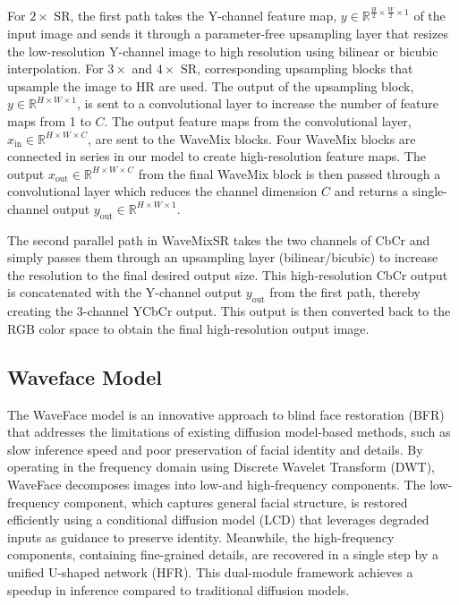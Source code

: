 For $2\times$ SR, the first path takes the Y-channel feature map, $y \in \mathbb{R}^{\frac{H}{2} \times \frac{W}{2} \times 1}$ of the input image and sends it through a parameter-free upsampling layer that resizes the low-resolution Y-channel image to high resolution using bilinear or bicubic interpolation. For $3\times$ and $4\times$ SR, corresponding upsampling blocks that upsample the image to HR are used. The output of the upsampling block, $y \in \mathbb{R}^{H \times W \times 1}$, is sent to a convolutional layer to increase the number of feature maps from 1 to $C$. The output feature maps from the convolutional layer, $x_{\text{in}} \in \mathbb{R}^{H \times W \times C}$, are sent to the WaveMix blocks. Four WaveMix blocks are connected in series in our model to create high-resolution feature maps. The output $x_{\text{out}} \in \mathbb{R}^{H \times W \times C}$ from the final WaveMix block is then passed through a convolutional layer which reduces the channel dimension $C$ and returns a single-channel output $y_{\text{out}} \in \mathbb{R}^{H \times W \times 1}$.

The second parallel path in WaveMixSR takes the two channels of CbCr and simply passes them through an upsampling layer (bilinear/bicubic) to increase the resolution to the final desired output size. This high-resolution CbCr output is concatenated with the Y-channel output $y_{\text{out}}$ from the first path, thereby creating the 3-channel YCbCr output. This output is then converted back to the RGB color space to obtain the final high-resolution output image.


\subsection{Waveface Model}

The WaveFace model is an innovative approach to blind face restoration (BFR) that addresses the limitations of existing diffusion model-based methods, such as slow inference speed and poor preservation of facial identity and details. By operating in the frequency domain using Discrete Wavelet Transform (DWT), WaveFace decomposes images into low-and high-frequency components. The low-frequency component, which captures general facial structure, is restored efficiently using a conditional diffusion model (LCD) that leverages degraded inputs as guidance to preserve identity. Meanwhile, the high-frequency components, containing fine-grained details, are recovered in a single step by a unified U-shaped network (HFR). This dual-module framework achieves a speedup in inference compared to traditional diffusion models.

